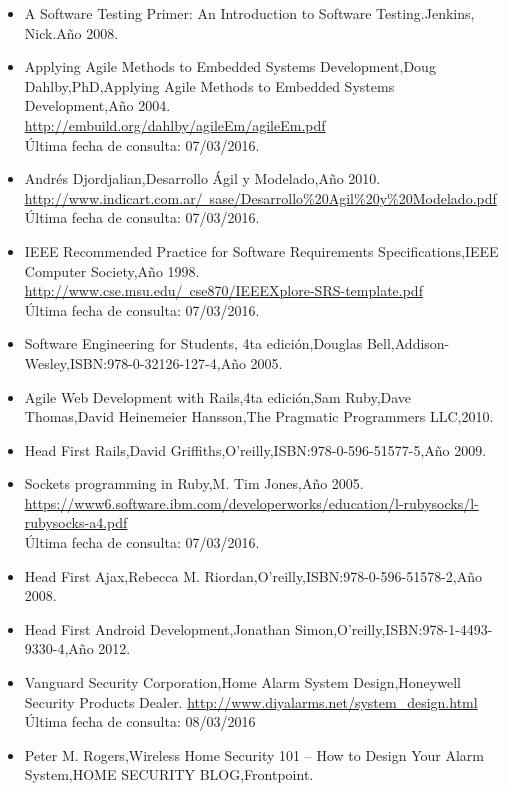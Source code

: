 \begin{itemize}
\item A Software Testing Primer: An Introduction to Software Testing.Jenkins, Nick.Año 2008.
\item Applying Agile Methods to Embedded Systems Development,Doug Dahlby,PhD,Applying Agile Methods to Embedded Systems Development,Año 2004.\\
	\href{url}{http://embuild.org/dahlby/agileEm/agileEm.pdf} \\
	Última fecha de consulta: 07/03/2016.
\item Andrés Djordjalian,Desarrollo Ágil y Modelado,Año 2010.\\
	\href{url}{http://www.indicart.com.ar/~sase/Desarrollo\%20Agil\%20y\%20Modelado.pdf}\\
	Última fecha de consulta: 	 07/03/2016.
\item IEEE Recommended Practice for Software Requirements Specifications,IEEE Computer Society,Año 1998.\\
	\href{url}{http://www.cse.msu.edu/~cse870/IEEEXplore-SRS-template.pdf}\\
	Última fecha de consulta: 	 07/03/2016.
\item Software Engineering for Students, 4ta edición,Douglas Bell,Addison-Wesley,ISBN:978-0-32126-127-4,Año 2005.
\item Agile Web Development with Rails,4ta edición,Sam Ruby,Dave Thomas,David Heinemeier Hansson,The Pragmatic Programmers LLC,2010.
\item Head First Rails,David Griffiths,O'reilly,ISBN:978-0-596-51577-5,Año 2009.
\item Sockets programming in Ruby,M. Tim Jones,Año 2005.\\
	\href{url}{https://www6.software.ibm.com/developerworks/education/l-rubysocks/l-rubysocks-a4.pdf}\\
	Última fecha de consulta: 	 07/03/2016.
\item Head First Ajax,Rebecca M. Riordan,O'reilly,ISBN:978-0-596-51578-2,Año 2008.
\item Head First Android Development,Jonathan Simon,O'reilly,ISBN:978-1-4493-9330-4,Año 2012.
\item Vanguard Security Corporation,Home Alarm System Design,Honeywell Security Products Dealer.
	\href{url}{http://www.diyalarms.net/system\_design.html}\\
	Última fecha de consulta: 	08/03/2016
\item Peter M. Rogers,Wireless Home Security 101 – How to Design Your Alarm System,HOME SECURITY BLOG,Frontpoint.\\

\end{itemize}
